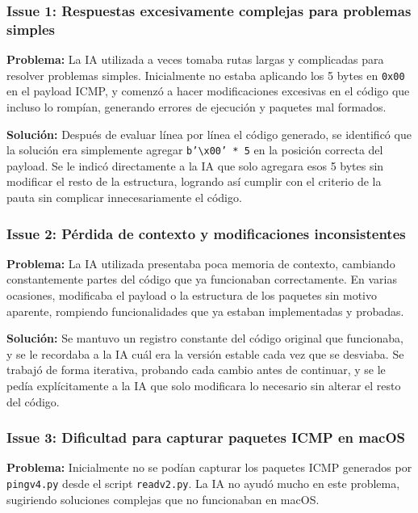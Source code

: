 \documentclass[letter,12pt]{article}
\begin{document}
\subsubsection*{Issue 1: Respuestas excesivamente complejas para problemas simples}

\textbf{Problema:} La IA utilizada a veces tomaba rutas largas y complicadas para resolver problemas simples. Inicialmente no estaba aplicando los 5 bytes en \texttt{0x00} en el payload ICMP, y comenzó a hacer modificaciones excesivas en el código que incluso lo rompían, generando errores de ejecución y paquetes mal formados.

\textbf{Solución:} Después de evaluar línea por línea el código generado, se identificó que la solución era simplemente agregar \texttt{b'\textbackslash x00' * 5} en la posición correcta del payload. Se le indicó directamente a la IA que solo agregara esos 5 bytes sin modificar el resto de la estructura, logrando así cumplir con el criterio de la pauta sin complicar innecesariamente el código.

\subsubsection*{Issue 2: Pérdida de contexto y modificaciones inconsistentes}

\textbf{Problema:} La IA utilizada presentaba poca memoria de contexto, cambiando constantemente partes del código que ya funcionaban correctamente. En varias ocasiones, modificaba el payload o la estructura de los paquetes sin motivo aparente, rompiendo funcionalidades que ya estaban implementadas y probadas.

\textbf{Solución:} Se mantuvo un registro constante del código original que funcionaba, y se le recordaba a la IA cuál era la versión estable cada vez que se desviaba. Se trabajó de forma iterativa, probando cada cambio antes de continuar, y se le pedía explícitamente a la IA que solo modificara lo necesario sin alterar el resto del código.

\subsubsection*{Issue 3: Dificultad para capturar paquetes ICMP en macOS}

\textbf{Problema:} Inicialmente no se podían capturar los paquetes ICMP generados por \texttt{pingv4.py} desde el script \texttt{readv2.py}. La IA no ayudó mucho en este problema, sugiriendo soluciones complejas que no funcionaban en macOS.
\end{document}
